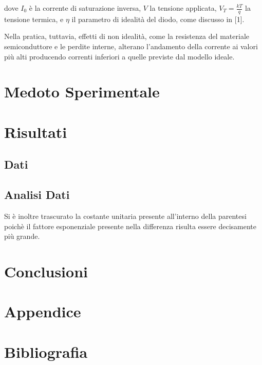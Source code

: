 \documentclass[a4paper,11pt]{article}
\begin{document}
dove $I_0$ è la corrente di saturazione inversa, $V$ la tensione applicata, $V_T = \frac{kT}{q}$ la tensione termica, e $\eta$ il parametro di idealità del diodo, come discusso in [1].

Nella pratica, tuttavia, effetti di non idealità, come la resistenza del materiale semiconduttore e le perdite interne, alterano l’andamento della corrente ai valori più alti producendo correnti inferiori a quelle previste dal modello ideale.
	
\section{Medoto Sperimentale}
\section{Risultati}
\subsection{Dati}
\subsection{Analisi Dati}
Si è inoltre trascurato la costante unitaria presente all'interno della parentesi poichè il fattore esponenziale presente nella differenza risulta essere decisamente più grande.
\section{Conclusioni}
\section{Appendice}
\section{Bibliografia}
\end{document}
